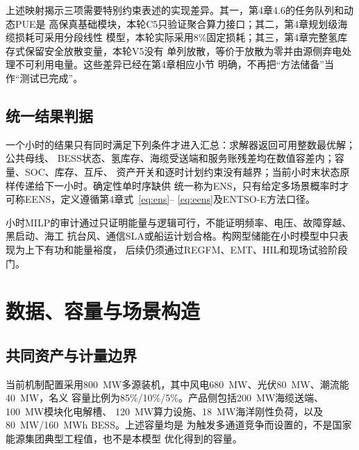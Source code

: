 上述映射揭示三项需要特别约束表述的实现差异。其一，第4章4.6的任务队列和动态PUE是
高保真基础模块，本轮C5只验证聚合算力接口；其二，第4章规划级海缆损耗可采用分段线性
模型，本轮实际采用8\%固定损耗；其三，第4章完整氢库存式保留安全放散变量，本轮V5没有
单列放散，等价于放散为零并由源侧弃电处理不可利用电量。这些差异已经在第4章相应小节
明确，不再把“方法储备”当作“测试已完成”。

\subsection{统一结果判据}

一个小时的结果只有同时满足下列条件才进入汇总：求解器返回可用整数最优解；公共母线、
BESS状态、氢库存、海缆受送端和服务账残差均在数值容差内；容量、SOC、库存、互斥、
资产开关和逐时计划约束没有越界；当前小时末状态原样传递给下一小时。确定性单时序缺供
统一称为ENS，只有给定多场景概率时才可称EENS，定义遵循第4章式~\eqref{eq:ens}--
\eqref{eq:eens}及ENTSO-E方法口径\cite{entsoe-maf}。

小时MILP的审计通过只证明能量与逻辑可行，不能证明频率、电压、故障穿越、黑启动、海工
抗台风、通信SLA或船运计划合格。构网型储能在小时模型中只表现为上下有功和能量裕度，
后续仍须通过REGFM、EMT、HIL和现场试验阶段门。

\section{数据、容量与场景构造}

\subsection{共同资产与计量边界}

当前机制配置采用800~MW多源装机，其中风电680~MW、光伏80~MW、潮流能40~MW，名义
容量比例为85\%/10\%/5\%。产品侧包括200~MW海缆送端、100~MW模块化电解槽、
120~MW算力设施、18~MW海洋刚性负荷，以及80~MW/160~MWh BESS。上述容量均是
为触发多通道竞争而设置的\assumptiontag，不是国家能源集团典型工程值，也不是本模型
优化得到的容量。

